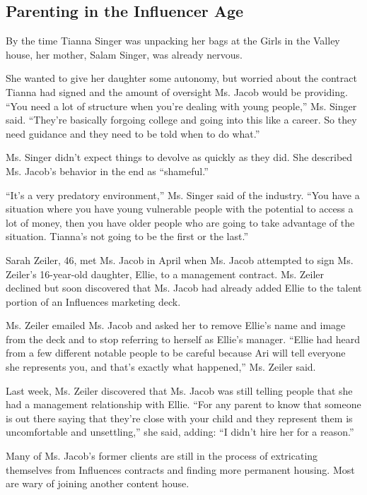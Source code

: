 \hypertarget{parenting-in-the-influencer-age}{%
\subsection{Parenting in the Influencer
Age}\label{parenting-in-the-influencer-age}}

By the time Tianna Singer was unpacking her bags at the Girls in the
Valley house, her mother, Salam Singer, was already nervous.

She wanted to give her daughter some autonomy, but worried about the
contract Tianna had signed and the amount of oversight Ms. Jacob would
be providing. ``You need a lot of structure when you're dealing with
young people,'' Ms. Singer said. ``They're basically forgoing college
and going into this like a career. So they need guidance and they need
to be told when to do what.''

Ms. Singer didn't expect things to devolve as quickly as they did. She
described Ms. Jacob's behavior in the end as ``shameful.''

``It's a very predatory environment,'' Ms. Singer said of the industry.
``You have a situation where you have young vulnerable people with the
potential to access a lot of money, then you have older people who are
going to take advantage of the situation. Tianna's not going to be the
first or the last.''

Sarah Zeiler, 46, met Ms. Jacob in April when Ms. Jacob attempted to
sign Ms. Zeiler's 16-year-old daughter, Ellie, to a management contract.
Ms. Zeiler declined but soon discovered that Ms. Jacob had already added
Ellie to the talent portion of an Influences marketing deck.

Ms. Zeiler emailed Ms. Jacob and asked her to remove Ellie's name and
image from the deck and to stop referring to herself as Ellie's manager.
``Ellie had heard from a few different notable people to be careful
because Ari will tell everyone she represents you, and that's exactly
what happened,'' Ms. Zeiler said.

Last week, Ms. Zeiler discovered that Ms. Jacob was still telling people
that she had a management relationship with Ellie. ``For any parent to
know that someone is out there saying that they're close with your child
and they represent them is uncomfortable and unsettling,'' she said,
adding: ``I didn't hire her for a reason.''

Many of Ms. Jacob's former clients are still in the process of
extricating themselves from Influences contracts and finding more
permanent housing. Most are wary of joining another content house.

